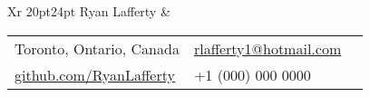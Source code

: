\documentclass[9pt]{extarticle}
\makeatletter
\newcommand\HUGE{\@setfontsize\Huge{20pt}{24pt}}
\makeatother
\begin{document}
{
    \begin{tabularx}{\textwidth}{Xr}
    {\HUGE\leavevmode\color{custom-color} Ryan Lafferty} &
        \null\hfill\small\begin{tabular}{llX}
            \faMapMarker\space\space\space\color{darkgrey} Toronto, Ontario, Canada & \faEnvelope\space\space\color{darkgrey} \href{mailto:rlafferty1@hotmail.com}{rlafferty1@hotmail.com} \\[3px]
            \faGithub\space\space\color{darkgrey} \href{https://github.com/RyanLafferty}{github.com/RyanLafferty} & {\large\faMobilePhone}\space\space\space\color{darkgrey} +1 (000) 000 0000 \\[10px]
        \end{tabular}
    \end{tabularx}

    {\color{custom-color}{\centerline{\rule{18.45cm}{0.4pt}}}}
}
\end{document}
